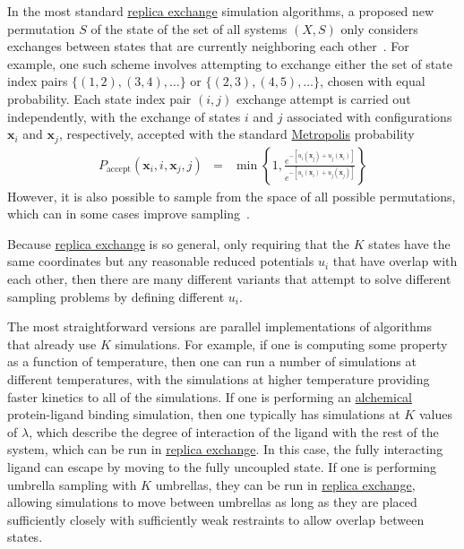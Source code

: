 \documentclass[9pt,review]{livecoms}
\newcommand{\vx}{\mathbf{x}}
\begin{document}
In the most standard \hyperlink{ref:ReplEx} {replica exchange} simulation algorithms, a proposed new permutation $S$ of the state of the set of all systems $(X,S)$  only considers exchanges between states that are currently neighboring each other~\cite{hukushima-nemoto:j-phys-soc-jpn:1996:parallel-tempering,hansmann:chem-phys-lett:1997:parallel-tempering-monte-carlo,sugita-okamoto:chem-phys-lett:1999:parallel-tempering-md,sugita-kitao-okamoto:jcp:2000:hamiltonian-exchange,fukunishi-watanabe-takada:jcp:2002:hamiltonian-exchange,jang-shin-pak:prl:2003:hamiltonian-exchange,kwak-hansmann:prl:2005:hamiltonian-exchange}.
For example, one such scheme involves attempting to exchange either the set of state index pairs $\{(1,2), (3,4), \ldots\}$ or $\{(2,3), (4,5), \ldots\}$, chosen with equal probability. Each state index pair $(i,j)$ exchange attempt is carried out independently, with the exchange of states $i$ and $j$ associated with configurations $\vx_i$ and $\vx_j$, respectively, accepted with the standard \hyperlink{ref:MetropolisMonteCarlo} {Metropolis} probability
\begin{eqnarray}
\label{eq:re_exchange_prob}
P_\mathrm{accept}(\vx_i, i, \vx_j, j) &=& \min\left\{ 1, \frac{e^{-[u_i(\vx_j)+u_j(\vx_i)]}}{e^{-[u_i(\vx_i) + u_j(\vx_j)]}}\right\}
\label{eq:metropolis-replica}
\end{eqnarray}
However, it is also possible to sample from the space of all possible permutations, which can in some cases improve sampling~\cite{shirts_gibbssamp}.

Because \hyperlink{ref:ReplEx} {replica exchange} is so general, only requiring that the $K$ states have the same coordinates but any reasonable reduced potentials $u_i$ that have overlap with each other, then there are many different variants that attempt to solve different sampling problems by defining different $u_i$.

The most straightforward versions are parallel implementations of algorithms that already use $K$ simulations. For example, if one is computing some property as a function of temperature, then one can run a number of simulations at different temperatures, with the simulations at higher temperature providing faster kinetics to all of the simulations. If one is performing an \hyperlink{ref:Alchemical} {alchemical} protein-ligand binding simulation, then one typically has simulations at $K$ values of $\lambda$, which describe the degree of interaction of the ligand with the rest of the system, which can be run in \hyperlink{ref:ReplEx} {replica exchange}. In this case, the fully interacting ligand can escape by moving to the fully uncoupled state. If one is performing umbrella sampling with $K$ umbrellas, they can be run in \hyperlink{ref:ReplEx} {replica exchange}, allowing simulations to move between umbrellas as long as they are placed sufficiently closely with sufficiently weak restraints to allow overlap between states.
\end{document}
